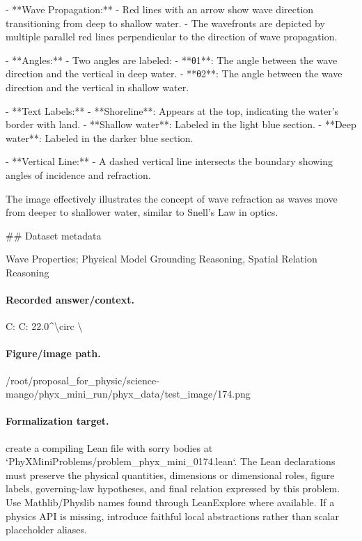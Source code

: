 - **Wave Propagation:**
  - Red lines with an arrow show wave direction transitioning from deep to shallow water.
  - The wavefronts are depicted by multiple parallel red lines perpendicular to the direction of wave propagation.

- **Angles:**
  - Two angles are labeled:
    - **θ1**: The angle between the wave direction and the vertical in deep water.
    - **θ2**: The angle between the wave direction and the vertical in shallow water.
    
- **Text Labels:**
  - **Shoreline**: Appears at the top, indicating the water's border with land.
  - **Shallow water**: Labeled in the light blue section.
  - **Deep water**: Labeled in the darker blue section.

- **Vertical Line:**
  - A dashed vertical line intersects the boundary showing angles of incidence and refraction. 

The image effectively illustrates the concept of wave refraction as waves move from deeper to shallower water, similar to Snell's Law in optics.

\#\# Dataset metadata

Wave Properties; Physical Model Grounding Reasoning, Spatial Relation Reasoning

\paragraph{Recorded answer/context.}
C: C: 22.0\textasciicircum{}\textbackslash{}circ \textbackslash{}

\paragraph{Figure/image path.}
/root/proposal\_for\_physic/science-mango/phyx\_mini\_run/phyx\_data/test\_image/174.png

\paragraph{Formalization target.}
create a compiling Lean file with sorry bodies at `PhyXMiniProblems/problem\_phyx\_mini\_0174.lean`. The Lean declarations must preserve the physical quantities, dimensions or dimensional roles, figure labels, governing-law hypotheses, and final relation expressed by this problem.
Use Mathlib/Physlib names found through LeanExplore where available. If a physics API is missing, introduce faithful local abstractions rather than scalar placeholder aliases.

